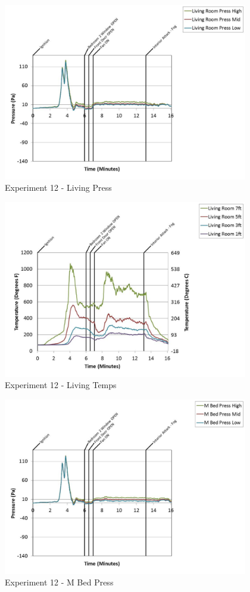 \documentclass{article}
\begin{document}
\begin{appendices}
	\clearpage

	\begin{figure}[h!]
		\centering
		\includegraphics[height=3.05in]{0_Images/Results_Charts/Exp_12_Charts/LivingPress.pdf}
		\caption{Experiment 12 - Living Press}
	\end{figure}
 

	\begin{figure}[h!]
		\centering
		\includegraphics[height=3.05in]{0_Images/Results_Charts/Exp_12_Charts/LivingTemps.pdf}
		\caption{Experiment 12 - Living Temps}
	\end{figure}
 
	\clearpage

	\begin{figure}[h!]
		\centering
		\includegraphics[height=3.05in]{0_Images/Results_Charts/Exp_12_Charts/MBedPress.pdf}
		\caption{Experiment 12 - M Bed Press}
	\end{figure}
 


\end{appendices}
\end{document}
